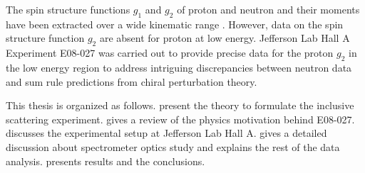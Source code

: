The spin structure functions $g_1$ and $g_2$ of proton and neutron and their moments have been extracted over a wide kinematic range \cite{Amarian2002,Amarian2004a,Amarian2004b,Wesselmann2007,Fatemi2003,Yun2003,Deur2004,Dharmawardane2004,Chen2004}. However, data on the spin structure function $g_2$ are absent for proton at low energy. Jefferson Lab Hall A Experiment E08-027 was carried out to provide precise data for the proton $g_2$ in the low energy region to address intriguing discrepancies between neutron data and sum rule predictions from chiral perturbation theory.

This thesis is organized as follows.  present the theory to formulate the inclusive scattering experiment.  gives a review of the physics motivation behind E08-027.  discusses the experimental setup at Jefferson Lab Hall A.  gives a detailed discussion about spectrometer optics study and  explains the rest of the data analysis.  presents results and the conclusions.

